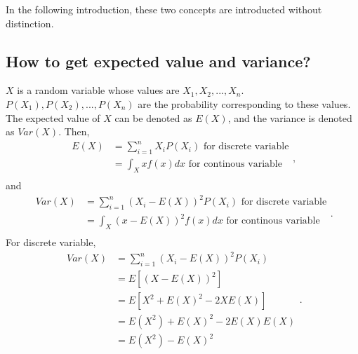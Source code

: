 \documentclass[10pt,onecolumn]{book}
\begin{document}
In the following introduction, these two concepts are introducted without distinction. 

\subsection{How to get expected value and variance?}
$X$ is a random variable whose values are $X_{1}, X_{2}, ..., X_{n}$. $P(X_{1}), P(X_{2}), ..., P(X_{n})$ are the probability corresponding to these values. The expected value of $X$ can be denoted as $E(X)$, and the variance is denoted as $Var(X)$. Then, 
\begin{equation}
\begin{split}
	E(X) & = \sum_{i = 1}^{n} X_{i}P(X_{i}) \text{\ for discrete variable} \\
		 & = \int_{X}xf(x)dx \text{\ for continous variable} \\	
\end{split},
\end{equation}
and
\begin{equation}
\begin{split}
	Var(X) & = \sum_{i = 1}^{n} (X_{i} - E(X))^2 P(X_{i}) \text{\ for discrete variable} \\
		 & = \int_{X}(x - E(X))^2 f(x) dx  \text{\ for continous variable} \\	
\end{split}.
\end{equation}
For discrete variable, 
\begin{equation}
\begin{split}
	Var(X) & = \sum_{i = 1}^{n} (X_{i} - E(X))^2 P(X_{i}) \\
		   & = E[(X - E(X))^2] \\
		   & = E[X^2 + E(X)^2 - 2XE(X)] \\
		   & = E(X^2) + E(X)^2 - 2E(X)E(X) \\
		   & = E(X^2) - E(X)^2
\end{split}.
\end{equation}
\end{document}
